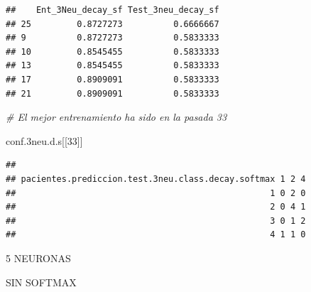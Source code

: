 \documentclass[]{article}
\newenvironment{Shaded}{\begin{snugshade}}{\end{snugshade}}
\newcommand{\CommentTok}[1]{\textcolor[rgb]{0.56,0.35,0.01}{\textit{#1}}}
\newcommand{\DataTypeTok}[1]{\textcolor[rgb]{0.13,0.29,0.53}{#1}}
\newcommand{\DecValTok}[1]{\textcolor[rgb]{0.00,0.00,0.81}{#1}}
\newcommand{\FloatTok}[1]{\textcolor[rgb]{0.00,0.00,0.81}{#1}}
\newcommand{\KeywordTok}[1]{\textcolor[rgb]{0.13,0.29,0.53}{\textbf{#1}}}
\newcommand{\NormalTok}[1]{#1}
\newcommand{\OperatorTok}[1]{\textcolor[rgb]{0.81,0.36,0.00}{\textbf{#1}}}
\newcommand{\StringTok}[1]{\textcolor[rgb]{0.31,0.60,0.02}{#1}}
\begin{document}
\begin{Shaded}
\end{Shaded}

\begin{verbatim}
##    Ent_3Neu_decay_sf Test_3neu_decay_sf
## 25         0.8727273          0.6666667
## 9          0.8727273          0.5833333
## 10         0.8545455          0.5833333
## 13         0.8545455          0.5833333
## 17         0.8909091          0.5833333
## 21         0.8909091          0.5833333
\end{verbatim}

\begin{Shaded}
\begin{Highlighting}[]
\CommentTok{# El mejor entrenamiento ha sido en la pasada 33}

\NormalTok{conf}\FloatTok{.3}\NormalTok{neu.d.s[[}\DecValTok{33}\NormalTok{]]}
\end{Highlighting}
\end{Shaded}

\begin{verbatim}
##                                                   
## pacientes.prediccion.test.3neu.class.decay.softmax 1 2 4
##                                                  1 0 2 0
##                                                  2 0 4 1
##                                                  3 0 1 2
##                                                  4 1 1 0
\end{verbatim}

5 NEURONAS

SIN SOFTMAX
\end{document}
